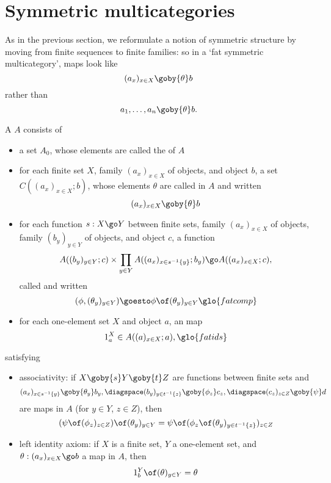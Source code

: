 \section{Symmetric multicategories}
%
%
%

As in the previous section, we reformulate a notion of symmetric structure
by moving from finite sequences to finite families: so in a `fat
symmetric multicategory', maps look like
\[
(a_x)_{x\in X} \goby{\theta} b
\]
rather than
\[
a_1, \ldots, a_n \goby{\theta} b.
\]

\begin{defn}	
A %
%
%
$A$ consists of
%
\begin{itemize}
\item a set $A_0$,%
% 
% 
whose elements are called the  of $A$
\item for each finite set $X$, family $(a_x)_{x\in X}$ of objects, and
object $b$, a set $C((a_x)_{x\in X}; b)$,%
% 
% 
whose elements $\theta$ are called
 in $A$ and written
\[
(a_x)_{x\in X} \goby{\theta} b
\]
\item for each function $s: X \go Y$ between finite sets, family
$(a_x)_{x\in X}$ of objects, family $(b_y)_{y\in Y}$ of objects, and object
$c$, a function
\[
A((b_y)_{y\in Y}; c)
\times
\prod_{y\in Y} A((a_x)_{x\in s^{-1}\{y\}}; b_y)
\go
A((a_x)_{x\in X}; c),
\]
called  and written
\[
(\phi, (\theta_y)_{y\in Y}) \goesto \phi \of (\theta_y)_{y\in Y}%
% 
\glo{fatcomp}
% 
\]
\item for each one-element set $X$ and object $a$, an  map
\[
1_a^X \in A((a)_{x\in X}; a),%
% 
\glo{fatids}
% 
\]
\end{itemize}
%
satisfying
%
\begin{itemize}
\item associativity: if $X \goby{s} Y \goby{t} Z$ are functions between
finite sets and 
\[
(a_x)_{x\in s^{-1}\{y\}} \goby{\theta_y} b_y,
\diagspace
(b_y)_{y\in t^{-1}\{z\}} \goby{\phi_z} c_z,
\diagspace
(c_z)_{z\in Z} \goby{\psi} d
\]
are maps in $A$ (for $y\in Y$, $z\in Z$), then
\[
(\psi \of (\phi_z)_{z\in Z}) \of (\theta_y)_{y\in Y}
=
\psi \of (\phi_z \of (\theta_y)_{y\in t^{-1}\{z\}})_{z\in Z}
\]
\item left identity axiom: if $X$ is a finite set, $Y$ a one-element set,
and $\theta: (a_x)_{x\in X} \go b$ a map in $A$, then
\[
1_b^Y \of (\theta)_{y\in Y} = \theta
\]
\end{itemize}
\end{defn}
